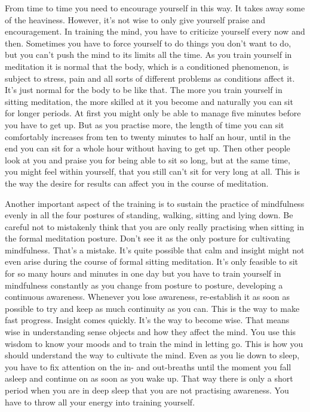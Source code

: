 From time to time you need to encourage yourself in this way. It takes away some of the heaviness. However, it's not wise to only give yourself praise and encouragement. In training the mind, you have to criticize yourself every now and then. Sometimes you have to force yourself to do things you don't want to do, but you can't push the mind to its limits all the time. As you train yourself in meditation it is normal that the body, which is a conditioned phenomenon, is subject to stress, pain and all sorts of different problems as conditions affect it. It's just normal for the body to be like that. The more you train yourself in sitting meditation, the more skilled at it you become and naturally you can sit for longer periods. At first you might only be able to manage five minutes before you have to get up. But as you practise more, the length of time you can sit comfortably increases from ten to twenty minutes to half an hour, until in the end you can sit for a whole hour without having to get up. Then other people look at you and praise you for being able to sit so long, but at the same time, you might feel within yourself, that you still can't sit for very long at all. This is the way the desire for results can affect you in the course of meditation.

Another important aspect of the training is to sustain the practice of mindfulness evenly in all the four postures of standing, walking, sitting and lying down. Be careful not to mistakenly think that you are only really practising when sitting in the formal meditation posture. Don't see it as the only posture for cultivating mindfulness. That's a mistake. It's quite possible that calm and insight might not even arise during the course of formal sitting meditation. It's only feasible to sit for so many hours and minutes in one day but you have to train yourself in mindfulness constantly as you change from posture to posture, developing a continuous awareness. Whenever you lose awareness, re-establish it as soon as possible to try and keep as much continuity as you can. This is the way to make fast progress. Insight comes quickly. It's the way to become wise. That means wise in understanding sense objects and how they affect the mind. You use this wisdom to know your moods and to train the mind in letting go. This is how you should understand the way to cultivate the mind. Even as you lie down to sleep, you have to fix attention on the in- and out-breaths until the moment you fall asleep and continue on as soon as you wake up. That way there is only a short period when you are in deep sleep that you are not practising awareness. You have to throw all your energy into training yourself.


